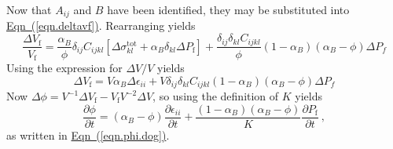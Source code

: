 \documentclass[12pt]{report}
\begin{document}
Now that $A_{ij}$ and $B$ have been identified, they may be
substituted into \hyperref[eqn.deltavf]{Eqn~(\ref*{eqn.deltavf})}.  Rearranging yields
\begin{equation}
\frac{\Delta V_{\mathrm{f}}}{V_{\mathrm{f}}} =
\frac{\alpha_{B}}{\phi}\delta_{ij}C_{ijkl} \left[ \Delta
\sigma_{kl}^{\mathrm{tot}} + \alpha_{B} \delta_{kl} \Delta P_{\mathrm{f}}
\right] +
\frac{\delta_{ij}\delta_{kl}C_{ijkl}}{\phi}(1-\alpha_{B})(\alpha_{B}-\phi)\Delta
P_{f}
\end{equation}
Using the expression for $\Delta V/V$ yields
\begin{equation}
\Delta V_{\mathrm{f}} = V\alpha_{B}\Delta\epsilon_{ii} +
V\delta_{ij}\delta_{kl}C_{ijkl}(1-\alpha_{B})(\alpha_{B}-\phi)\Delta P_{f}
\end{equation}
Now $\Delta\phi = V^{-1}\Delta V_{\mathrm{f}} -
V_{\mathrm{f}}V^{-2}\Delta V$, so using the definition of $K$
yields
\begin{equation}
\frac{\partial \phi}{\partial t} = (\alpha_{B} - \phi)\frac{\partial
  \epsilon_{ii}}{\partial t} + \frac{(1-\alpha_{B})(\alpha_{B} -
  \phi)}{K}\frac{\partial P_{\mathrm{f}}}{\partial t} \ ,
\end{equation}
as written in \hyperref[eqn.phi.dog]{Eqn~(\ref*{eqn.phi.dog})}.
\end{document}
